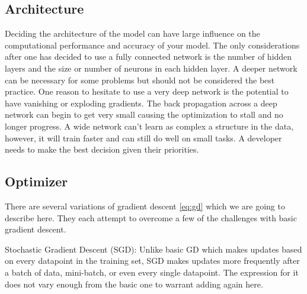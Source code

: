 \documentclass[10pt]{amsart}
\begin{document}
\subsection{Architecture}
Deciding the architecture of the model can have large influence on the computational performance and accuracy of your model.
The only considerations after one has decided to use a fully connected network is the number of hidden layers and the size or number of neurons in each hidden layer.
A deeper network can be necessary for some problems but should not be considered the best practice.
One reason to hesitate to use a very deep network is the potential to have vanishing or exploding gradients.
The back propagation across a deep network can begin to get very small causing the optimization to stall and no longer progress.
A wide network can't learn as complex a structure in the data, however, it will train faster and can still do well on small tasks.
A developer needs to make the best decision given their priorities.

\subsection{Optimizer}
There are several variations of gradient descent \eqref{eq:gd} which we are going to describe here.
They each attempt to overcome a few of the challenges with basic gradient descent.

Stochastic Gradient Descent (SGD):
Unlike basic GD which makes updates based on every datapoint in the training set, SGD makes updates more frequently after a batch of data, mini-batch, or even every single datapoint.
The expression for it does not vary enough from the basic one to warrant adding again here.
\end{document}
